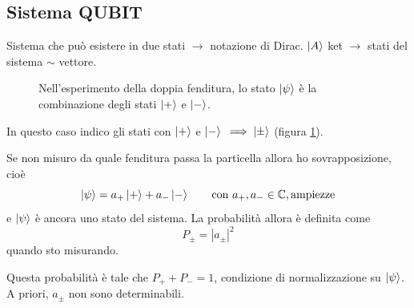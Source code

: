 \subsection{Sistema QUBIT}
Sistema che può esistere in due stati \(\rightarrow\) notazione di Dirac.
\(\ket{A}\) ket \(\rightarrow\) stati del sistema \(\sim\) vettore.
\begin{figure}
  \centering
  \caption{
    Nell'esperimento della doppia fenditura, lo stato \( \ket{\psi} \) è la
    combinazione degli stati \( \ket{+} \) e \( \ket{-} \).
  }
  \label{stati_qubit}
\end{figure}
In questo caso indico gli stati con \(\ket{+}\) e \(\ket{-}\)
\(\implies \ket{\pm}\) (figura \ref{stati_qubit}).

\bigskip
\noindent
Se non misuro da quale fenditura passa la particella allora ho sovrapposizione,
cioè
\[
  \ket{\psi} = a_+ \ket{+} + a_- \ket{-}
  \qquad
  \text{con } a_+, a_- \in \mathbb{C}, \mathrm{ampiezze}
\]
e \(\ket{\psi}\) è ancora uno stato del sistema. La probabilità allora è
definita come
\[
  P_\pm = |a_\pm|^2
\]
quando sto misurando.

\bigskip
\noindent
Questa probabilità è tale che \(P_+ + P_- = 1\), condizione di normalizzazione
su \(\ket{\psi}\). A priori, \(a_\pm\) non sono determinabili.

